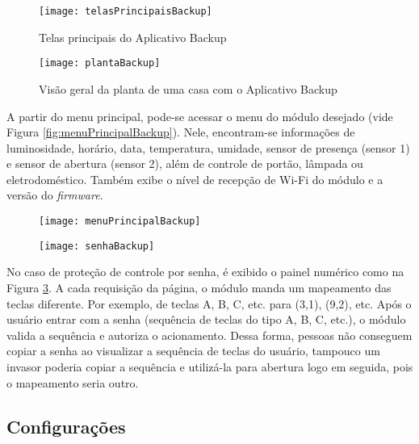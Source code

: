\begin{figure}[H]
	\centering
	\caption{Telas principais do Aplicativo Backup}
  \texttt{[image: telasPrincipaisBackup]}
\label{fig:telasPrincipaisBackup}
\end{figure}

\begin{figure}[H]
  \centering
  \caption{Visão geral da planta de uma casa com o Aplicativo Backup}
  \texttt{[image: plantaBackup]}
  \label{fig:plantaBackup}
\end{figure}

A partir do menu principal, pode-se acessar o menu do módulo desejado (vide Figura \ref{fig:menuPrincipalBackup}). Nele, encontram-se informações de luminosidade, horário, data, temperatura, umidade, sensor de presença (sensor 1) e sensor de abertura (sensor 2), além de controle de portão, lâmpada ou eletrodoméstico. Também exibe o nível de recepção de Wi-Fi do módulo e a versão do \emph{firmware}.

\begin{figure}[hbp]
    \centering
    \begin{minipage}{.4\linewidth}
        \centering
        \texttt{[image: menuPrincipalBackup]}
        \label{fig:menuPrincipalBackup}
    \end{minipage}
    \hfill
    \begin{minipage}{.4\linewidth}
        \centering
        \texttt{[image: senhaBackup]}
        \label{fig:senhaBackup}
    \end{minipage}
\end{figure}

No caso de proteção de controle por senha, é exibido o painel numérico como na Figura \ref{fig:senhaBackup}. A cada requisição da página, o módulo manda um mapeamento das teclas diferente. Por exemplo, de teclas A, B, C, etc. para (3,1), (9,2), etc. Após o usuário entrar com a senha (sequência de teclas do tipo A, B, C, etc.), o módulo valida a sequência e autoriza o acionamento. Dessa forma, pessoas não conseguem copiar a senha ao visualizar a sequência de teclas do usuário, tampouco um invasor poderia copiar a sequência e utilizá-la para abertura logo em seguida, pois o mapeamento seria outro.

\subsection{Configurações}

